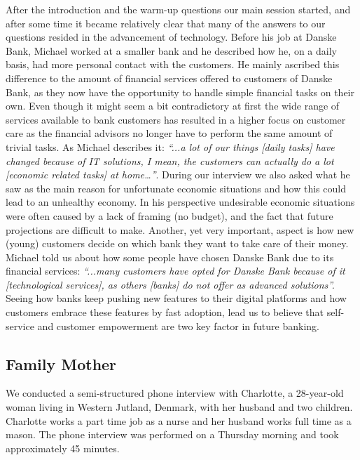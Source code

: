 After the introduction and the warm-up questions our main session started, and after some time it became relatively clear that many of the answers to our questions resided in the advancement of technology. Before his job at Danske Bank, Michael worked at a smaller bank and he described how he, on a daily basis, had more personal contact with the customers. He mainly ascribed this difference to the amount of financial services offered to customers of Danske Bank, as they now have the opportunity to handle simple financial tasks on their own. Even though it might seem a bit contradictory at first the wide range of services available to bank customers has resulted in a higher focus on customer care as the financial advisors no longer have to perform the same amount of trivial tasks. As Michael describes it: \emph{“...a lot of our things [daily tasks] have changed because of IT solutions, I mean, the customers can actually do a lot [economic related tasks] at home…”}.
During our interview we also asked what he saw as the main reason for unfortunate economic situations and how this could lead to an unhealthy economy. In his perspective undesirable economic situations were often caused by a lack of framing (no budget), and the fact that future projections are difficult to make. Another, yet very important, aspect is how new (young) customers decide on which bank they want to take care of their money. Michael told us about how some people have chosen Danske Bank due to its financial services: \emph{“...many customers have opted for Danske Bank because of it [technological services], as others [banks] do not offer as advanced solutions”.} Seeing how banks keep pushing new features to their digital platforms and how customers embrace these features by fast adoption, lead us to believe that self-service and customer empowerment are two key factor in future banking.

\subsection{Family Mother}
We conducted a semi-structured phone interview \cite[chapter~7]{sharp2007interaction} with Charlotte, a 28-year-old woman living in Western Jutland, Denmark, with her husband and two children. Charlotte works a part time job as a nurse and her husband works full time as a mason. The phone interview was performed on a Thursday morning and took approximately 45 minutes.

